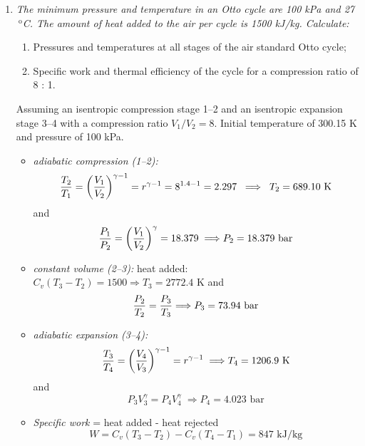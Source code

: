 \begin{enumerate}
\item {\it The minimum pressure and temperature in an Otto cycle are 100 kPa and 27 $^{\text{ o}}$C. The amount of heat added to the air per cycle is 1500 kJ/kg. Calculate:
\begin{enumerate}
\item Pressures and temperatures at all stages of the air standard Otto cycle;
\item Specific  work and thermal efficiency of the cycle for a compression ratio of 8 : 1.
\end{enumerate}
}
Assuming an isentropic compression stage 1--2 and an isentropic expansion stage 3--4 with a compression ratio $V_{1}/V_{2}= 8$. Initial temperature of 300.15 K and pressure of 100 kPa.
\begin{itemize}
%
\item {\it adiabatic compression (1--2):}
\begin{displaymath}
  \displaystyle\frac{T_{2}}{T_{1}}=\left(\displaystyle\frac{V_{1}}{V_{2}}\right)^{\gamma-1}=r^{\gamma-1}=8^{1.4-1}=2.297\;\;\Longrightarrow\;\;T_{2}=689.10\text{ K}
\end{displaymath}
and
\begin{displaymath}
\displaystyle\frac{P_{1}}{P_{2}}=\left(\displaystyle\frac{V_{1}}{V_{2}}\right)^{\gamma}=18.379\;\Longrightarrow P_{2}=18.379\text{ bar}
\end{displaymath}

\item {\it constant volume (2--3):} heat added: $C_{v}\left(T_{3}-T_{2}\right)=1500\Longrightarrow T_{3}=2772.4\text{ K}$ and 
\begin{displaymath}
\displaystyle\frac{P_{2}}{T_{2}}=\displaystyle\frac{P_{3}}{T_{3}}\Longrightarrow P_{3}=73.94\text{ bar}
\end{displaymath}

\item {\it adiabatic expansion (3--4):}
\begin{displaymath}
\displaystyle\frac{T_{3}}{T_{4}}=\left(\displaystyle\frac{V_{4}}{V_{3}}\right)^{\gamma-1}=r^{\gamma-1}\;\Longrightarrow T_{4}=1206.9\text{ K}
\end{displaymath}
and
\begin{displaymath}
P_{3}V_{3}^{\gamma}=P_{4}V_{4}^{\gamma}\;\Longrightarrow P_{4}=4.023\text{ bar}
\end{displaymath}

\item {\it Specific work} = heat added - heat rejected
\begin{displaymath}
W= C_{v}\left(T_{3}-T_{2}\right)-C_{v}\left(T_{4}-T_{1}\right)=847\text{ kJ/kg}
\end{displaymath}


\end{itemize}
\end{enumerate}
